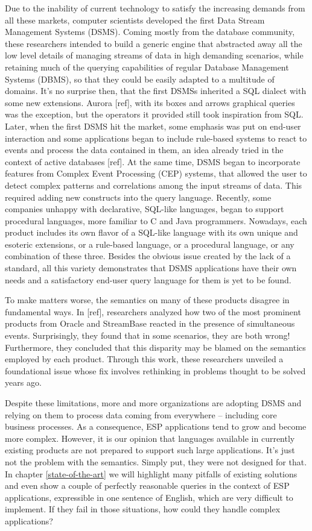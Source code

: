 \documentclass{report}
\begin{document}
Due to the inability of current technology to satisfy the increasing
demands from all these markets, computer scientists developed the
first Data Stream Management Systems (DSMS). Coming mostly from the
database community, these researchers intended to build a generic
engine that abstracted away all the low level details of managing
streams of data in high demanding scenarios, while retaining much of
the querying capabilities of regular Database Management Systems
(DBMS), so that they could be easily adapted to a multitude of
domains. It's no surprise then, that the first DSMSs inherited a SQL
dialect with some new extensions. Aurora [ref], with its boxes and
arrows graphical queries was the exception, but the operators it
provided still took inspiration from SQL. Later, when the first DSMS
hit the market, some emphasis was put on end-user interaction and some
applications began to include rule-based systems to react to events
and process the data contained in them, an idea already tried in the
context of active databases [ref]. At the same time, DSMS began to
incorporate features from Complex Event Processing (CEP) systems, that
allowed the user to detect complex patterns and correlations among the
input streams of data. This required adding new constructs into the
query language. Recently, some companies unhappy with declarative,
SQL-like languages, began to support procedural languages, more
familiar to C and Java programmers. Nowadays, each product includes
its own flavor of a SQL-like language with its own unique and esoteric
extensions, or a rule-based language, or a procedural language, or any
combination of these three. Besides the obvious issue created by the
lack of a standard, all this variety demonstrates that DSMS
applications have their own needs and a satisfactory end-user query
language for them is yet to be found.

To make matters worse, the semantics on many of these products
disagree in fundamental ways. In [ref], researchers analyzed how two
of the most prominent products from Oracle and StreamBase reacted in
the presence of simultaneous events. Surprisingly, they found that in
some scenarios, they are both wrong! Furthermore, they concluded that
this disparity may be blamed on the semantics employed by each
product. Through this work, these researchers unveiled a foundational
issue whose fix involves rethinking in problems thought to be solved
years ago.

Despite these limitations, more and more organizations are adopting
DSMS and relying on them to process data coming from everywhere --
including core business processes. As a consequence, ESP applications
tend to grow and become more complex. However, it is our opinion that
languages available in currently existing products are not prepared to
support such large applications. It's just not the problem with the
semantics. Simply put, they were not designed for that. In chapter
\ref{state-of-the-art} we will highlight many pitfalls of existing
solutions and even show a couple of perfectly reasonable queries in
the context of ESP applications, expressible in one sentence of
English, which are very difficult to implement. If they fail in those
situations, how could they handle complex applications?
\end{document}
